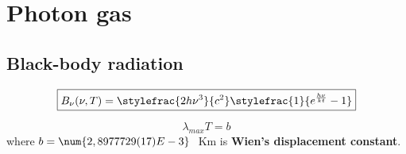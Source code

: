 \chapter{Photon gas}
\section{Black-body radiation}
	\begin{formula}
		\begin{equation}
			\label{photon:plancks_law_frequency}
            \boxed{B_\nu(\nu, T) = \stylefrac{2h\nu^3}{c^2}\stylefrac{1}{e^{\frac{h\nu}{kt}} - 1}}
		\end{equation}
	\end{formula}
    
	\begin{formula}
		\begin{equation}
			\label{photon:wiens_displacement_law}
			\boxed{\lambda_{max}T = b}
		\end{equation}
		where $b = \num{2,8977729(17)E-3}\ $ Km is \textbf{Wien's displacement constant}.
	\end{formula}
